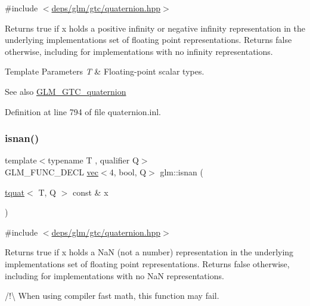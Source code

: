 {\ttfamily \#include $<$\hyperlink{gtc_2quaternion_8hpp}{deps/glm/gtc/quaternion.\+hpp}$>$}

Returns true if x holds a positive infinity or negative infinity representation in the underlying implementation\textquotesingle{}s set of floating point representations. Returns false otherwise, including for implementations with no infinity representations.


\begin{DoxyTemplParams}{Template Parameters}
{\em T} & Floating-\/point scalar types.\\
\hline
\end{DoxyTemplParams}
\begin{DoxySeeAlso}{See also}
\hyperlink{group__gtc__quaternion}{G\+L\+M\+\_\+\+G\+T\+C\+\_\+quaternion} 
\end{DoxySeeAlso}


Definition at line 794 of file quaternion.\+inl.

\mbox{\label{group__gtc__quaternion_ga31f4378ab97985177e208f4f4f8b1fd3}} 
\subsubsection{\texorpdfstring{isnan()}{isnan()}}
{\footnotesize\ttfamily template$<$typename T , qualifier Q$>$ \\
G\+L\+M\+\_\+\+F\+U\+N\+C\+\_\+\+D\+E\+CL \hyperlink{structglm_1_1vec}{vec}$<$4, bool, Q$>$ glm\+::isnan (\begin{DoxyParamCaption}\item[{\hyperlink{structglm_1_1tquat}{tquat}$<$ T, Q $>$ const \&}]{x }\end{DoxyParamCaption})}



{\ttfamily \#include $<$\hyperlink{gtc_2quaternion_8hpp}{deps/glm/gtc/quaternion.\+hpp}$>$}

Returns true if x holds a NaN (not a number) representation in the underlying implementation\textquotesingle{}s set of floating point representations. Returns false otherwise, including for implementations with no NaN representations.

/!\textbackslash{} When using compiler fast math, this function may fail.


